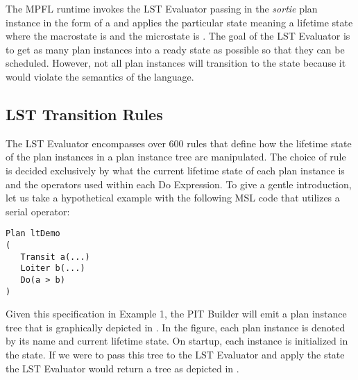The MPFL runtime invokes the LST Evaluator passing in the \emph{sortie} plan instance in the form of a  and applies the particular state  meaning a lifetime state where the macrostate is  and the microstate is . The goal of the LST Evaluator is to get as many plan instances into a ready state as possible so that they can be scheduled. However, not all plan instances will transition to the  state because it would violate the semantics of the language.

\subsection{LST Transition Rules}
The LST Evaluator encompasses over 600 rules that define how the lifetime state of the plan instances in a plan instance tree are manipulated. The choice of rule is decided exclusively by what the current lifetime state of each plan instance is and the operators used within each Do Expression. To give a gentle introduction, let us take a hypothetical example with the following MSL code that utilizes a serial operator:

\begin{verbatim}
Plan ltDemo
(
   Transit a(...)
   Loiter b(...)
   Do(a > b)
)
\end{verbatim}


Given this specification in Example 1, the PIT Builder will emit a plan instance tree that is graphically depicted in . In the figure, each plan instance is denoted by its name and current lifetime state. On startup, each instance is initialized in the  state. If we were to pass this tree to the LST Evaluator and apply the state  the LST Evaluator would return a tree as depicted in .


